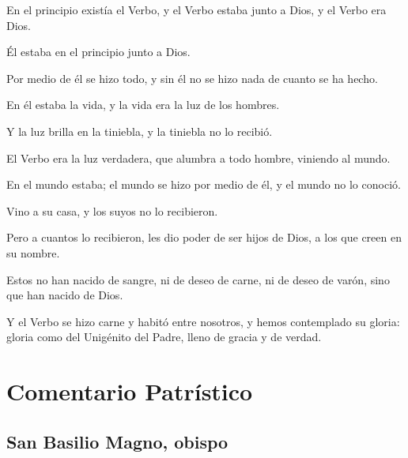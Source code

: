 \begin{scripture}
	En el principio existía el Verbo, y el Verbo estaba junto a Dios, y el Verbo era Dios.
	
	Él estaba en el principio junto a Dios.
	
	Por medio de él se hizo todo, y sin él no se hizo nada de cuanto se ha hecho.
	
	En él estaba la vida, y la vida era la luz de los hombres.
	
	Y la luz brilla en la tiniebla, y la tiniebla no lo recibió.
	
	El Verbo era la luz verdadera, que alumbra a todo hombre, viniendo al mundo.
	
	En el mundo estaba; el mundo se hizo por medio de él, y el mundo no lo conoció.
	
	Vino a su casa, y los suyos no lo recibieron.
	
	Pero a cuantos lo recibieron, les dio poder de ser hijos de Dios, a los que creen en su nombre.
	
	Estos no han nacido de sangre, ni de deseo de carne, ni de deseo de varón, sino que han nacido de Dios.
	
	Y el Verbo se hizo carne y habitó entre nosotros, y hemos contemplado su gloria: gloria como del Unigénito del Padre, lleno de gracia y de verdad.
\end{scripture}


\newsection

\section{Comentario Patrístico}

\subsection{San Basilio Magno, obispo}



